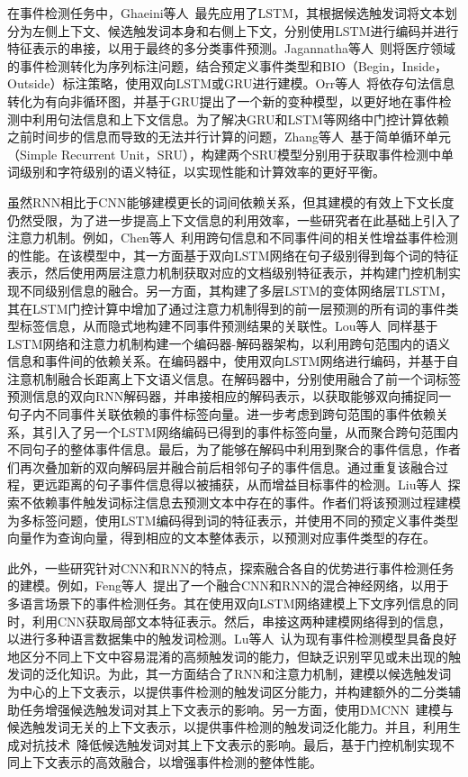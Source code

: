 在事件检测任务中，Ghaeini等人~\cite{ghaeini2016event}最先应用了LSTM，其根据候选触发词将文本划分为左侧上下文、候选触发词本身和右侧上下文，分别使用LSTM进行编码并进行特征表示的串接，以用于最终的多分类事件预测。Jagannatha等人~\cite{jagannatha2016bidirectional}则将医疗领域的事件检测转化为序列标注问题，结合预定义事件类型和BIO（Begin，Inside，Outside）标注策略，使用双向LSTM或GRU进行建模。Orr等人~\cite{orr2018event}将依存句法信息转化为有向非循环图，并基于GRU提出了一个新的变种模型，以更好地在事件检测中利用句法信息和上下文信息。为了解决GRU和LSTM等网络中门控计算依赖之前时间步的信息而导致的无法并行计算的问题，Zhang等人~\cite{zhang2019empower}基于简单循环单元（Simple Recurrent Unit，SRU），构建两个SRU模型分别用于获取事件检测中单词级别和字符级别的语义特征，以实现性能和计算效率的更好平衡。

虽然RNN相比于CNN能够建模更长的词间依赖关系，但其建模的有效上下文长度仍然受限，为了进一步提高上下文信息的利用效率，一些研究者在此基础上引入了注意力机制。例如，Chen等人~\cite{chen2018collective}利用跨句信息和不同事件间的相关性增益事件检测的性能。在该模型中，其一方面基于双向LSTM网络在句子级别得到每个词的特征表示，然后使用两层注意力机制获取对应的文档级别特征表示，并构建门控机制实现不同级别信息的融合。另一方面，其构建了多层LSTM的变体网络层TLSTM，其在LSTM门控计算中增加了通过注意力机制得到的前一层预测的所有词的事件类型标签信息，从而隐式地构建不同事件预测结果的关联性。Lou等人~\cite{lou2021mlbinet}同样基于LSTM网络和注意力机制构建一个编码器-解码器架构，以利用跨句范围内的语义信息和事件间的依赖关系。在编码器中，使用双向LSTM网络进行编码，并基于自注意机制融合长距离上下文语义信息。在解码器中，分别使用融合了前一个词标签预测信息的双向RNN解码器，并串接相应的解码表示，以获取能够双向捕捉同一句子内不同事件关联依赖的事件标签向量。进一步考虑到跨句范围的事件依赖关系，其引入了另一个LSTM网络编码已得到的事件标签向量，从而聚合跨句范围内不同句子的整体事件信息。最后，为了能够在解码中利用到聚合的事件信息，作者们再次叠加新的双向解码层并融合前后相邻句子的事件信息。通过重复该融合过程，更远距离的句子事件信息得以被捕获，从而增益目标事件的检测。Liu等人~\cite{liu2019event}探索不依赖事件触发词标注信息去预测文本中存在的事件。作者们将该预测过程建模为多标签问题，使用LSTM编码得到词的特征表示，并使用不同的预定义事件类型向量作为查询向量，得到相应的文本整体表示，以预测对应事件类型的存在。

此外，一些研究针对CNN和RNN的特点，探索融合各自的优势进行事件检测任务的建模。例如，Feng等人~\cite{feng2018language}提出了一个融合CNN和RNN的混合神经网络，以用于多语言场景下的事件检测任务。其在使用双向LSTM网络建模上下文序列信息的同时，利用CNN获取局部文本特征表示。然后，串接这两种建模网络得到的信息，以进行多种语言数据集中的触发词检测。Lu等人~\cite{lu2019distilling}认为现有事件检测模型具备良好地区分不同上下文中容易混淆的高频触发词的能力，但缺乏识别罕见或未出现的触发词的泛化知识。为此，其一方面结合了RNN和注意力机制，建模以候选触发词为中心的上下文表示，以提供事件检测的触发词区分能力，并构建额外的二分类辅助任务增强候选触发词对其上下文表示的影响。另一方面，使用DMCNN~\cite{chen2015event}建模与候选触发词无关的上下文表示，以提供事件检测的触发词泛化能力。并且，利用生成对抗技术~\cite{creswell2018generative}降低候选触发词对其上下文表示的影响。最后，基于门控机制实现不同上下文表示的高效融合，以增强事件检测的整体性能。

